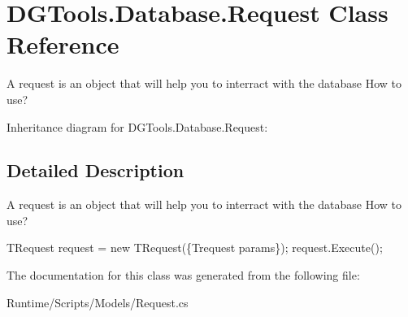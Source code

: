 \hypertarget{class_d_g_tools_1_1_database_1_1_request}{}\section{D\+G\+Tools.\+Database.\+Request Class Reference}
\label{class_d_g_tools_1_1_database_1_1_request}


A request is an object that will help you to interract with the database How to use?  




Inheritance diagram for D\+G\+Tools.\+Database.\+Request\+:


\subsection{Detailed Description}
A request is an object that will help you to interract with the database How to use? 

{\ttfamily  T\+Request request = new T\+Request(\{Trequest params\}); request.\+Execute(); } 

The documentation for this class was generated from the following file\+:\begin{DoxyCompactItemize}
\item 
Runtime/\+Scripts/\+Models/Request.\+cs\end{DoxyCompactItemize}
